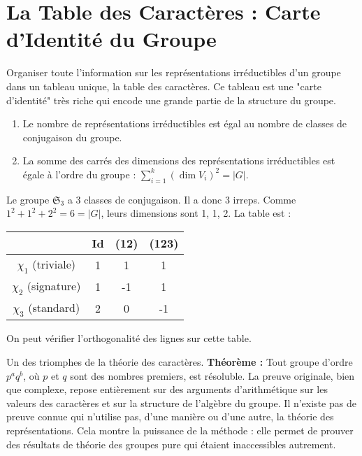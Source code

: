 \section{La Table des Caractères : Carte d'Identité du Groupe}

\begin{objectif}
    Organiser toute l'information sur les représentations irréductibles d'un groupe dans un tableau unique, la table des caractères. Ce tableau est une "carte d'identité" très riche qui encode une grande partie de la structure du groupe.
\end{objectif}

\begin{proposition}
    \begin{enumerate}
        \item Le nombre de représentations irréductibles est égal au nombre de classes de conjugaison du groupe.
        \item La somme des carrés des dimensions des représentations irréductibles est égale à l'ordre du groupe : $\sum_{i=1}^k (\dim V_i)^2 = |G|$.
    \end{enumerate}
\end{proposition}

\begin{example}
    Le groupe $\mathfrak{S}_3$ a 3 classes de conjugaison. Il a donc 3 irreps. Comme $1^2+1^2+2^2=6=|G|$, leurs dimensions sont 1, 1, 2. La table est :
    \begin{center}
    \begin{tabular}{c|ccc}
      & Id & (12) & (123) \\
      \hline
      $\chi_1$ (triviale) & 1 & 1 & 1 \\
      $\chi_2$ (signature) & 1 & -1 & 1 \\
      $\chi_3$ (standard) & 2 & 0 & -1 \\
    \end{tabular}
    \end{center}
    On peut vérifier l'orthogonalité des lignes sur cette table.
\end{example}

\begin{application}
    Un des triomphes de la théorie des caractères.
    \textbf{Théorème :} Tout groupe d'ordre $p^a q^b$, où $p$ et $q$ sont des nombres premiers, est résoluble.
    La preuve originale, bien que complexe, repose entièrement sur des arguments d'arithmétique sur les valeurs des caractères et sur la structure de l'algèbre du groupe. Il n'existe pas de preuve connue qui n'utilise pas, d'une manière ou d'une autre, la théorie des représentations. Cela montre la puissance de la méthode : elle permet de prouver des résultats de théorie des groupes pure qui étaient inaccessibles autrement.
\end{application}